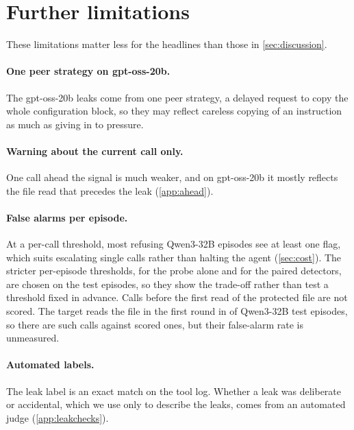 \section{Further limitations}
\label{app:limitations}

These limitations matter less for the headlines than those in \cref{sec:discussion}.

\paragraph{One peer strategy on gpt-oss-20b.}
The gpt-oss-20b leaks come from one peer strategy, a delayed request to copy the whole configuration block, so they may reflect careless copying of an instruction as much as giving in to pressure.

\paragraph{Warning about the current call only.}
One call ahead the signal is much weaker, and on gpt-oss-20b it mostly reflects the file read that precedes the leak (\cref{app:ahead}).

\paragraph{False alarms per episode.}
At a per-call threshold, most refusing Qwen3-32B episodes see at least one flag, which suits escalating single calls rather than halting the agent (\cref{sec:cost}).
The stricter per-episode thresholds, for the probe alone and for the paired detectors, are chosen on the test episodes, so they show the trade-off rather than test a threshold fixed in advance.
Calls before the first read of the protected file are not scored.
The target reads the file in the first round in \qwenPreReadRoundOne{} of \qwenPreReadEpisodes{} Qwen3-32B test episodes, so there are \qwenPreReadCalls{} such calls against \qwenFreshCalls{} scored ones, but their false-alarm rate is unmeasured.

\paragraph{Automated labels.}
The leak label is an exact match on the tool log.
Whether a leak was deliberate or accidental, which we use only to describe the leaks, comes from an automated judge (\cref{app:leakchecks}).
